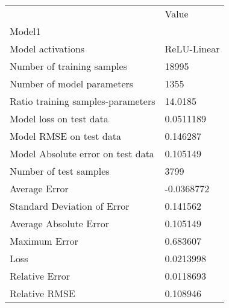 \begin{tabular}{ll}
\toprule
{} &        Value \\
Model1                            &              \\
\midrule
Model activations                 &  ReLU-Linear \\
Number of training samples        &        18995 \\
Number of model parameters        &         1355 \\
Ratio training samples-parameters &      14.0185 \\
Model loss on test data           &    0.0511189 \\
Model RMSE on test data           &     0.146287 \\
Model Absolute error on test data &     0.105149 \\
Number of test samples            &         3799 \\
Average Error                     &   -0.0368772 \\
Standard Deviation of Error       &     0.141562 \\
Average Absolute Error            &     0.105149 \\
Maximum Error                     &     0.683607 \\
Loss                              &    0.0213998 \\
Relative Error                    &    0.0118693 \\
Relative RMSE                     &     0.108946 \\
\bottomrule
\end{tabular}
